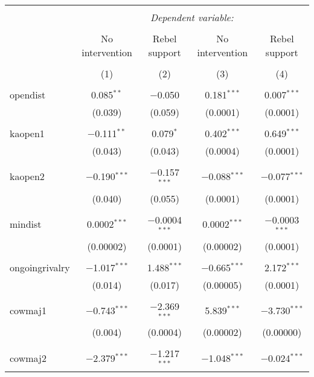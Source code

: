 
\begin{table}[!htbp] \centering 
  \caption{} 
  \label{} 
\begin{tabular}{@{\extracolsep{5pt}}lcccc} 
\\[-1.8ex]\hline 
\hline \\[-1.8ex] 
 & \multicolumn{4}{c}{\textit{Dependent variable:}} \\ 
\cline{2-5} 
\\[-1.8ex] & No intervention & Rebel support & No intervention & Rebel support \\ 
\\[-1.8ex] & (1) & (2) & (3) & (4)\\ 
\hline \\[-1.8ex] 
 opendist & 0.085$^{**}$ & $-$0.050 & 0.181$^{***}$ & 0.007$^{***}$ \\ 
  & (0.039) & (0.059) & (0.0001) & (0.0001) \\ 
  & & & & \\ 
 kaopen1 & $-$0.111$^{**}$ & 0.079$^{*}$ & 0.402$^{***}$ & 0.649$^{***}$ \\ 
  & (0.043) & (0.043) & (0.0004) & (0.0001) \\ 
  & & & & \\ 
 kaopen2 & $-$0.190$^{***}$ & $-$0.157$^{***}$ & $-$0.088$^{***}$ & $-$0.077$^{***}$ \\ 
  & (0.040) & (0.055) & (0.0001) & (0.0001) \\ 
  & & & & \\ 
 mindist & 0.0002$^{***}$ & $-$0.0004$^{***}$ & 0.0002$^{***}$ & $-$0.0003$^{***}$ \\ 
  & (0.00002) & (0.0001) & (0.00002) & (0.0001) \\ 
  & & & & \\ 
 ongoingrivalry & $-$1.017$^{***}$ & 1.488$^{***}$ & $-$0.665$^{***}$ & 2.172$^{***}$ \\ 
  & (0.014) & (0.017) & (0.00005) & (0.0001) \\ 
  & & & & \\ 
 cowmaj1 & $-$0.743$^{***}$ & $-$2.369$^{***}$ & 5.839$^{***}$ & $-$3.730$^{***}$ \\ 
  & (0.004) & (0.0004) & (0.00002) & (0.00000) \\ 
  & & & & \\ 
 cowmaj2 & $-$2.379$^{***}$ & $-$1.217$^{***}$ & $-$1.048$^{***}$ & $-$0.024$^{***}$ \\ 

\end{tabular}
\end{table}
